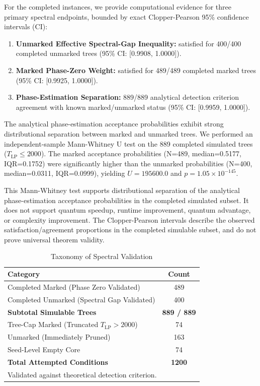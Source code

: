 \documentclass[conference]{IEEEtran} \IEEEoverridecommandlockouts
\begin{document}
For the completed instances, we provide computational evidence for three primary spectral endpoints, bounded by exact Clopper-Pearson 95\% confidence intervals (CI):
\begin{enumerate}
    \item \textbf{Unmarked Effective Spectral-Gap Inequality:} satisfied for 400/400 completed unmarked trees (95\% CI: [0.9908, 1.0000]).
    \item \textbf{Marked Phase-Zero Weight:} satisfied for 489/489 completed marked trees (95\% CI: [0.9925, 1.0000]).
    \item \textbf{Phase-Estimation Separation:} 889/889 analytical detection criterion agreement with known marked/unmarked status (95\% CI: [0.9959, 1.0000]).
\end{enumerate}

The analytical phase-estimation acceptance probabilities exhibit strong distributional separation between marked and unmarked trees. We performed an independent-sample Mann-Whitney U test on the 889 completed simulated trees ($T_{\text{LP}} \le 2000$). The marked acceptance probabilities (N=489, median=0.5177, IQR=0.1752) were significantly higher than the unmarked probabilities (N=400, median=0.0311, IQR=0.0999), yielding $U = 195600.0$ and $p = 1.05\times 10^{-145}$.

This Mann-Whitney test supports distributional separation of the analytical phase-estimation acceptance probabilities in the completed simulated subset. It does not support quantum speedup, runtime improvement, quantum advantage, or complexity improvement. The Clopper-Pearson intervals describe the observed satisfaction/agreement proportions in the completed simulable subset, and do not prove universal theorem validity.

\begin{table}[htbp] \caption{Taxonomy of Spectral Validation} \label{tab:measured} \begin{center} \begin{tabular}{lc} \toprule \textbf{Category} & \textbf{Count} \\ \midrule Completed Marked (Phase Zero Validated) & 489 \\ Completed Unmarked (Spectral Gap Validated) & 400 \\ \midrule \textbf{Subtotal Simulable Trees} & \textbf{889 / 889} \\ \midrule Tree-Cap Marked (Truncated $T_{\text{LP}} > 2000$) & 74 \\ Unmarked (Immediately Pruned) & 163 \\ Seed-Level Empty Core & 74 \\ \midrule \textbf{Total Attempted Conditions} & \textbf{1200} \\ \bottomrule \multicolumn{2}{p{\columnwidth}}{\footnotesize Validated against theoretical detection criterion.} \end{tabular} \end{center} \end{table}
\end{document}
